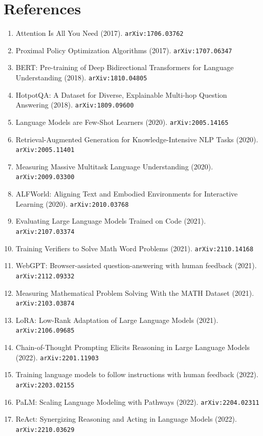 \documentclass[11pt]{article}
\begin{document}
\section*{References}
\begin{enumerate}\small
  \item Attention Is All You Need (2017). \texttt{arXiv:1706.03762}
  \item Proximal Policy Optimization Algorithms (2017). \texttt{arXiv:1707.06347}
  \item BERT: Pre-training of Deep Bidirectional Transformers for Language
  Understanding (2018). \texttt{arXiv:1810.04805}
  \item HotpotQA: A Dataset for Diverse, Explainable Multi-hop Question
  Answering (2018). \texttt{arXiv:1809.09600}
  \item Language Models are Few-Shot Learners (2020). \texttt{arXiv:2005.14165}
  \item Retrieval-Augmented Generation for Knowledge-Intensive NLP Tasks (2020). \texttt{arXiv:2005.11401}
  \item Measuring Massive Multitask Language Understanding (2020). \texttt{arXiv:2009.03300}
  \item ALFWorld: Aligning Text and Embodied Environments for Interactive
  Learning (2020). \texttt{arXiv:2010.03768}
  \item Evaluating Large Language Models Trained on Code (2021). \texttt{arXiv:2107.03374}
  \item Training Verifiers to Solve Math Word Problems (2021). \texttt{arXiv:2110.14168}
  \item WebGPT: Browser-assisted question-answering with human feedback (2021). \texttt{arXiv:2112.09332}
  \item Measuring Mathematical Problem Solving With the MATH Dataset (2021). \texttt{arXiv:2103.03874}
  \item LoRA: Low-Rank Adaptation of Large Language Models (2021). \texttt{arXiv:2106.09685}
  \item Chain-of-Thought Prompting Elicits Reasoning in Large Language Models (2022). \texttt{arXiv:2201.11903}
  \item Training language models to follow instructions with human feedback (2022). \texttt{arXiv:2203.02155}
  \item PaLM: Scaling Language Modeling with Pathways (2022). \texttt{arXiv:2204.02311}
  \item ReAct: Synergizing Reasoning and Acting in Language Models (2022). \texttt{arXiv:2210.03629}

\end{enumerate}
\end{document}
